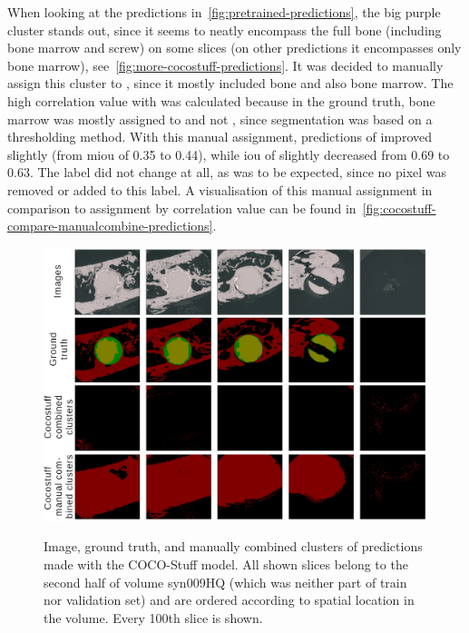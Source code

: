 When looking at the predictions in~\autoref{fig:pretrained-predictions}, the big purple  cluster stands out, since it seems to neatly encompass the full bone (including bone marrow and screw) on some slices (on other predictions it encompasses only bone marrow), see~\autoref{fig:more-cocostuff-predictions}.
It was decided to manually assign this cluster to , since it mostly included bone and also bone marrow. 
The high correlation value with  was calculated because in the ground truth, bone marrow was mostly assigned to  and not , since segmentation was based on a thresholding method.
With this manual assignment, predictions of  improved slightly (from \gls{miou} of 0.35 to 0.44), while \gls{iou} of  slightly decreased from 0.69 to 0.63.
The  label did not change at all, as was to be expected, since no pixel was removed or added to this label.
A visualisation of this manual assignment in comparison to assignment by correlation value can be found in~\autoref{fig:cocostuff-compare-manualcombine-predictions}.
\begin{figure}[!htb]
    \centering
    \includegraphics[width=\textwidth]{pictures/experiment_1/cocostuff-compare-manual-combined_example_predictions_2}\\
    \caption[Manually Combined Clusters of COCO-Stuff]{Image, ground truth, and manually combined clusters of predictions made with the COCO-Stuff model. All shown slices belong to the second half of volume syn009HQ (which was neither part of train nor validation set) and are ordered according to spatial location in the volume. Every 100th slice is shown.}
    \label{fig:cocostuff-compare-manualcombine-predictions}
\end{figure}


